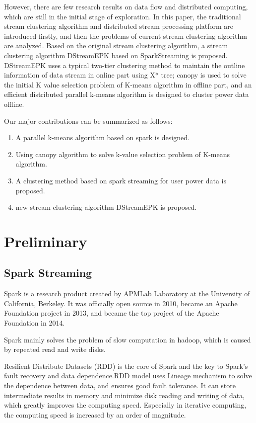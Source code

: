 \documentclass[runningheads]{llncs}
\begin{document}
 However, there are few research results on data flow and distributed computing, which are still in the initial stage of exploration. In this paper, the traditional stream clustering algorithm and distributed stream processing platform are introduced firstly, and then the problems of current stream clustering algorithm are analyzed. Based on the original stream clustering algorithm, a stream clustering algorithm DStreamEPK based on SparkStreaming is proposed. DStreamEPK uses a typical two-tier clustering method to maintain the outline information of data stream in online part using X* tree; canopy is used to solve the initial K value selection problem of K-means algorithm in offline part, and an efficient distributed parallel k-means algorithm is designed to cluster power data offline.
 
 Our major contributions can be summarized as follows:
   \begin{enumerate}
     \item  A parallel k-means algorithm based on spark is designed.
     \item  Using canopy algorithm to solve k-value selection problem of K-means algorithm.
     \item  A clustering method based on spark streaming for user power data is proposed.
     \item  new stream clustering algorithm DStreamEPK is proposed.
   \end{enumerate}
 

\section{Preliminary}
\subsection{Spark Streaming}
Spark is a research product created by APMLab Laboratory at the University of California, Berkeley. It was officially open source in 2010, became an Apache Foundation project in 2013, and became the top project of the Apache Foundation in 2014.

Spark\cite{spark} mainly solves the problem of slow computation in hadoop, which is caused by repeated read and write disks.

Resilient Distribute Datasets (RDD) is the core of Spark and the key to Spark's fault recovery and data dependence.RDD model uses Lineage mechanism to solve the dependence between data, and ensures good fault tolerance. It can store intermediate results in memory and minimize disk reading and writing of data, which greatly improves the computing speed. Especially in iterative computing, the computing speed is increased by an order of magnitude.
\end{document}
